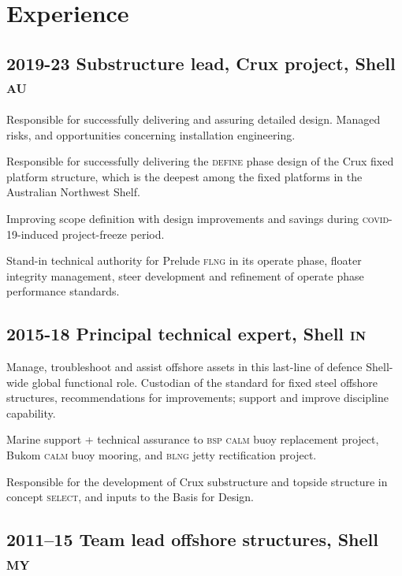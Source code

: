 \section*{Experience} %
\label{sec:exp}

\subsection*{2019-23 Substructure lead, Crux project, Shell \textsc{au}} %
\label{sub:c1}

Responsible for successfully delivering and assuring detailed design. Managed risks, and opportunities concerning installation engineering.

Responsible for successfully delivering the \textsc{define} phase design of the Crux fixed platform structure, which is the deepest among the fixed platforms in the Australian Northwest Shelf.

Improving scope definition with design improvements and savings during \textsc{covid-19}-induced project-freeze period.

Stand-in technical authority for Prelude \textsc{flng} in its operate phase, floater integrity management, steer development and refinement of operate phase performance standards.


\subsection*{2015-18 Principal technical expert, Shell \textsc{in}} %
\label{sub:c2}

Manage, troubleshoot and assist offshore assets in this last-line of defence Shell-wide global functional role. Custodian of the standard for fixed steel offshore structures, recommendations for improvements; support and improve discipline capability.

Marine support + technical assurance to \textsc{bsp} \textsc{calm} buoy replacement project, Bukom \textsc{calm} buoy mooring, and \textsc{blng} jetty rectification project.

Responsible for the development of Crux substructure and topside structure in concept \textsc{select}, and inputs to the Basis for Design.


\subsection*{2011--15 Team lead offshore structures, Shell \textsc{my}} %
\label{sub:c3}

